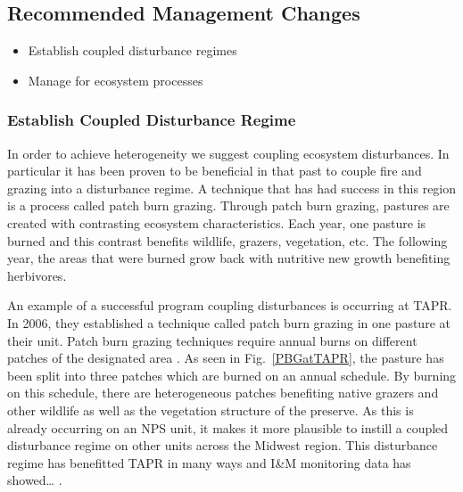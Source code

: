 \hypertarget{recommended-management-changes}{%
\subsection{Recommended Management Changes}\label{recommended-management-changes}}

\begin{itemize}
	\item Establish coupled disturbance regimes
	\item Manage for ecosystem processes
\end{itemize}

\hypertarget{establish-coupled-disturbance-regime}{%
\subsubsection{Establish Coupled Disturbance Regime}
\label{establish-coupled-disturbance-regime}}

In order to achieve heterogeneity we suggest coupling ecosystem
disturbances. In particular it has been proven to be beneficial in that
past to couple fire and grazing into a disturbance regime. A technique
that has had success in this region is a process called patch burn
grazing. Through patch burn grazing, pastures are created with
contrasting ecosystem characteristics. Each year, one pasture is burned
and this contrast benefits wildlife, grazers, vegetation, etc. The
following year, the areas that were burned grow back with nutritive new
growth benefiting herbivores.

An example of a successful program coupling disturbances is occurring at TAPR. 
In 2006, they established a technique called patch burn grazing in one pasture at their unit. 
Patch burn grazing techniques require annual burns on different patches of the designated area \citep{fuhlendorf2009, toombs2010, scasta2016}. 
As seen in Fig.~\ref{PBGatTAPR}, the pasture has been split into three patches which are burned on an annual schedule. 
By burning on this schedule, there are heterogeneous patches benefiting native grazers and other wildlife as well as the vegetation structure of the preserve. 
As this is already occurring on an NPS unit, it makes it more plausible to instill a coupled disturbance regime on other units across the Midwest region. 
This disturbance regime has benefitted TAPR in many ways
and I\&M monitoring data has showed\ldots{} \citep{leis2018}.


